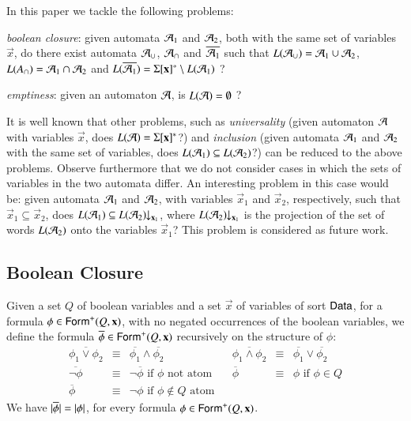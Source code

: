 \documentclass[10pt]{llncs}
\begin{document}
In this paper we tackle the following problems: \begin{compactenum}
\item \emph{boolean closure}: given automata $\mathcal{A}_1$ and $\mathcal{A}_2$, both
  with the same set of variables $\vec{x}$, do there exist automata
  $\mathcal{A}_\cup$, $\mathcal{A}_\cap$ and $\overline{\mathcal{A}_1}$ such that $L(\mathcal{A}_\cup) =
  \mathcal{A}_1 \cup \mathcal{A}_2$, $L(A_\cap) = \mathcal{A}_1 \cap \mathcal{A}_2$ and
  $L(\overline{\mathcal{A}_1}) = \Sigma[\mathbf x]^* \setminus L(\mathcal{A}_1)$ ?
%
\item \emph{emptiness}: given an automaton $\mathcal{A}$, is $L(\mathcal{A}) =
  \emptyset$ ?
\end{compactenum}

It is well known that other problems, such as \emph{universality}
(given automaton $\mathcal{A}$ with variables $\vec{x}$, does $L(\mathcal{A}) =
\Sigma[\mathbf x]^*$?) and \emph{inclusion} (given automata $\mathcal{A}_1$ and
$\mathcal{A}_2$ with the same set of variables, does $L(\mathcal{A}_1) \subseteq
L(\mathcal{A}_2)$?) can be reduced to the above problems. Observe furthermore
that we do not consider cases in which the sets of variables in the
two automata differ. An interesting problem in this case would be: given
automata $\mathcal{A}_1$ and $\mathcal{A}_2$, with variables $\vec{x}_1$ and
$\vec{x}_2$, respectively, such that $\vec{x}_1 \subseteq \vec{x}_2$,
does $L(\mathcal{A}_1) \subseteq {L(\mathcal{A}_2)}\!\!\downarrow_{{\mathbf x_1}}$, where
${L(\mathcal{A}_2)}\!\!\downarrow_{{\mathbf x_1}}$ is the projection of the set of words
$L(\mathcal{A}_2)$ onto the variables $\vec{x}_1$? This problem is considered
as future work.

\subsection{Boolean Closure}

Given a set $Q$ of boolean variables and a set $\vec{x}$ of variables
of sort $\mathsf{Data}$, for a formula $\phi \in \mathsf{Form}^+(Q,\mathbf x)$, with no
negated occurrences of the boolean variables, we define the formula
$\overline{\phi} \in \mathsf{Form}^+(Q,\mathbf x)$ recursively on the structure
of $\phi$:
\[\begin{array}{rclcrcl}
\overline{\phi_1 \vee \phi_2} & \equiv & \overline{\phi_1} \wedge \overline{\phi_2} && 
\overline{\phi_1 \wedge \phi_2} & \equiv & \overline{\phi_1} \vee \overline{\phi_2} \\ 
\overline{\neg\phi} & \equiv & \neg \overline{\phi} \text{ if $\phi$ not atom} &&
\overline{\phi} & \equiv & \phi \text{ if $\phi \in Q$} \\
\overline{\phi} & \equiv & \neg\phi \text{ if $\phi \not\in Q$ atom}
\end{array}\]
We have ${|{\overline{\phi}}|} = {|{\phi}|}$, for every formula $\phi
\in \mathsf{Form}^+(Q,\mathbf x)$.
\end{document}
